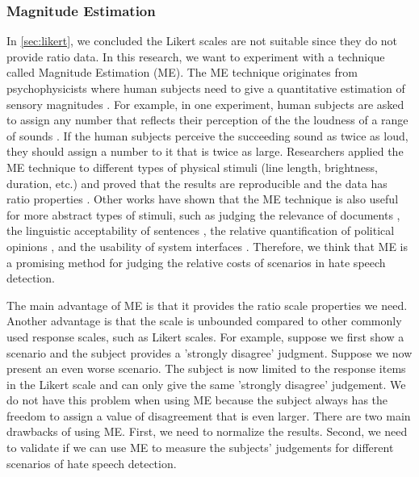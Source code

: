 \documentclass[a4paper]{article}
\begin{document}
\subsubsection{Magnitude Estimation}
In \ref{sec:likert}, we concluded the Likert scales are not suitable since they do not provide ratio data. In this research, we want to experiment with a technique called Magnitude Estimation (ME). The ME technique originates from psychophysicists where human subjects need to give a quantitative estimation of sensory magnitudes \cite{stevens1956direct}. For example, in one experiment, human subjects are asked to assign any number that reflects their perception of the the loudness of a range of sounds \cite{stevens1956direct}. If the human subjects perceive the succeeding sound as twice as loud, they should assign a number to it that is twice as large. Researchers applied the ME technique to different types of physical stimuli (line length, brightness, duration, etc.) and proved that the results are reproducible and the data has ratio properties \cite{moskowitz1977magnitude}. Other works have shown that the ME technique is also useful for more abstract types of stimuli, such as judging the relevance of documents \cite{maddalena2017crowdsourcing}, the linguistic acceptability of sentences \cite{bard1996magnitude}, the relative quantification of political opinions \cite{lodge1979comparisons}, and the usability of system interfaces \cite{mcgee2004master}. Therefore, we think that ME is a promising method for judging the relative costs of scenarios in hate speech detection.

The main advantage of ME is that it provides the ratio scale properties we need. Another advantage is that the scale is unbounded compared to other commonly used response scales, such as Likert scales. For example, suppose we first show a scenario and the subject provides a 'strongly disagree' judgment. Suppose we now present an even worse scenario. The subject is now limited to the response items in the Likert scale and can only give the same 'strongly disagree' judgement. We do not have this problem when using ME because the subject always has the freedom to assign a value of disagreement that is even larger. There are two main drawbacks of using ME. First, we need to normalize the results. Second, we need to validate if we can use ME to measure the subjects' judgements for different scenarios of hate speech detection.
\end{document}
